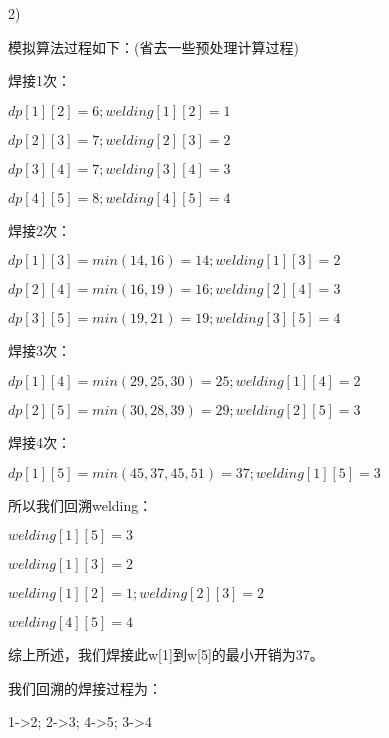 \documentclass[UTF8]{ctexart}
\begin{document}
2)

模拟算法过程如下：(省去一些预处理计算过程)

焊接1次：

$dp[1][2] = 6;welding[1][2] = 1$

$dp[2][3] = 7;welding[2][3] = 2$

$dp[3][4] = 7;welding[3][4] = 3$

$dp[4][5] = 8;welding[4][5] = 4$

焊接2次：

$dp[1][3] = min(14,16) = 14;welding[1][3] = 2$

$dp[2][4] = min(16,19) = 16;welding[2][4] = 3$

$dp[3][5] = min(19, 21) = 19;welding[3][5] = 4$

焊接3次：

$dp[1][4] = min(29,25,30) = 25;welding[1][4] = 2$

$dp[2][5] = min(30,28,39) = 29;welding[2][5] = 3$

焊接4次：

$dp[1][5] = min(45,37,45,51) = 37;welding[1][5] = 3$

所以我们回溯welding：

$welding[1][5] = 3$

\quad $welding[1][3] = 2$

\qquad $welding[1][2] = 1;welding[2][3] = 2$

\quad $welding[4][5] = 4$

综上所述，我们焊接此w[1]到w[5]的最小开销为37。

我们回溯的焊接过程为：

1->2; 2->3; 4->5; 3->4
\end{document}
